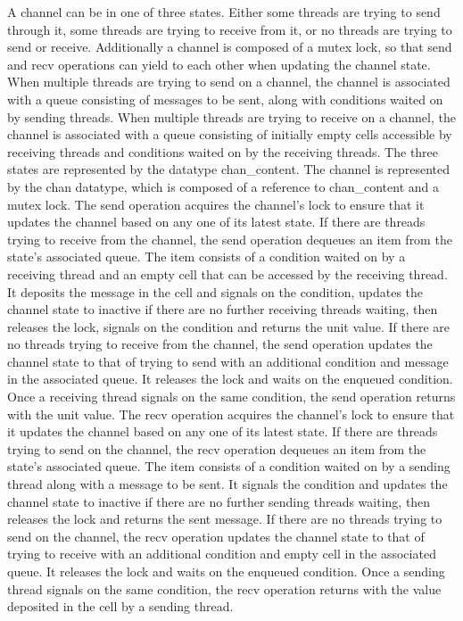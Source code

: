 \documentclass{article}
\begin{document}
  A channel can be in one of three states.  Either some threads are trying to send through it, some threads are trying to receive from it, or no threads are trying to send or receive.  Additionally a channel is composed of a mutex lock, so that send and recv operations can yield to each other when updating the channel state.  When multiple threads are trying to send on a channel, the channel is associated with a queue consisting of messages to be sent, along with conditions waited on by sending threads. When multiple threads are trying to receive on a channel, the channel is associated with a queue consisting of initially empty cells accessible by receiving threads and conditions waited on by the receiving threads. The three states are represented by the datatype chan\_content.  The channel is represented by the chan datatype, which is composed of a reference to chan\_content and a mutex lock.  
	The send operation acquires the channel's lock to ensure that it updates the channel based on any one of its latest state.  If there are threads trying to receive from the channel, the send operation dequeues an item from the state's associated queue.  The item consists of a condition waited on by a receiving thread and an empty cell that can be accessed by the receiving thread.  It deposits the message in the cell and signals on the condition, updates the channel state to inactive if there are no further receiving threads waiting, then releases the lock, signals on the condition and returns the unit value.  If there are no threads trying to receive from the channel, the send operation updates the channel state to that of trying to send with an additional condition and message in the associated queue.  It releases the lock and waits on the enqueued condition.  Once a receiving thread signals on the same condition, the send operation returns with the unit value.
	The recv operation acquires the channel's lock to ensure that it updates the channel based on any one of its latest state.  If there are threads trying to send on the channel, the recv operation dequeues an item from the state's associated queue.  The item consists of a condition waited on by a sending thread along with a message to be sent.  It signals the condition and updates the channel state to inactive if there are no further sending threads waiting, then releases the lock and returns the sent message.  If there are no threads trying to send on the channel, the recv operation updates the channel state to that of trying to receive with an additional condition and empty cell in the associated queue.  It releases the lock and waits on the enqueued condition.  Once a sending thread signals on the same condition, the recv operation returns with the value deposited in the cell by a sending thread.
\end{document}
